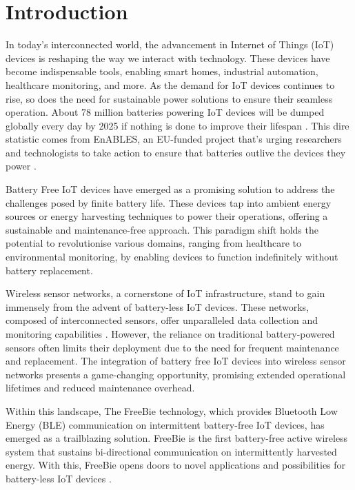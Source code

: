 \chapter{Introduction}
\label{chp:introduction}
In today's interconnected world, the advancement in Internet of Things (IoT) devices is reshaping the way we interact with technology. These devices have become indispensable tools, enabling smart homes, industrial automation, healthcare monitoring, and more. As the demand for IoT devices continues to rise, so does the need for sustainable power solutions to ensure their seamless operation. About 78 million batteries powering IoT devices will be dumped globally every day by 2025 if nothing is done to improve their lifespan \cite{2023up}. This dire statistic comes from EnABLES, an EU-funded project that’s urging researchers and technologists to take action to ensure that batteries outlive the devices they power \cite{2023up}.
\vspace{1\baselineskip}

\noindent Battery Free IoT devices have emerged as a promising solution to address the challenges posed by finite battery life. These devices tap into ambient energy sources or energy harvesting techniques to power their operations, offering a sustainable and maintenance-free approach. This paradigm shift holds the potential to revolutionise various domains, ranging from healthcare to environmental monitoring, by enabling devices to function indefinitely without battery replacement.
\vspace{1\baselineskip}

\noindent Wireless sensor networks, a cornerstone of IoT infrastructure, stand to gain immensely from the advent of battery-less IoT devices. These networks, composed of interconnected sensors, offer unparalleled data collection and monitoring capabilities \cite{2021Battery}. However, the reliance on traditional battery-powered sensors often limits their deployment due to the need for frequent maintenance and replacement. The integration of battery free IoT devices into wireless sensor networks presents a game-changing opportunity, promising extended operational lifetimes and reduced maintenance overhead.
\vspace{1\baselineskip}

\noindent Within this landscape, The FreeBie technology, which provides Bluetooth Low Energy (BLE) communication on intermittent battery-free IoT devices, has emerged as a trailblazing solution. FreeBie is the first battery-free active wireless system that sustains bi-directional communication on intermittently harvested energy. With this, FreeBie opens doors to novel applications and possibilities for battery-less IoT devices \cite{de2022Intermittently}.

